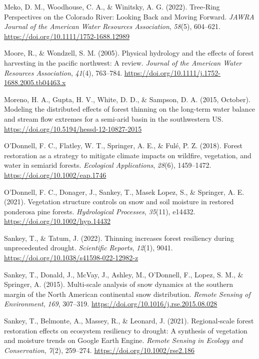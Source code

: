 \documentclass[
]{agujournal2019}
\newlength{\cslhangindent}
\newenvironment{CSLReferences}[2] %
 {\begin{list}{}{%
  \setlength{\itemindent}{0pt}
  \setlength{\leftmargin}{0pt}
  \setlength{\parsep}{0pt}
  \ifodd #1
   \setlength{\leftmargin}{\cslhangindent}
   \setlength{\itemindent}{-1\cslhangindent}
  \fi
  \setlength{\itemsep}{#2\baselineskip}}}
 {\end{list}}
\begin{document}
\begin{CSLReferences}{1}{0}
Meko, D. M., Woodhouse, C. A., \& Winitsky, A. G. (2022). Tree‐{Ring}
{Perspectives} on the {Colorado} {River}: {Looking} {Back} and {Moving}
{Forward}. \emph{JAWRA Journal of the American Water Resources
Association}, \emph{58}(5), 604--621.
\url{https://doi.org/10.1111/1752-1688.12989}

Moore, R., \& Wondzell, S. M. (2005). Physical hydrology and the effects
of forest harvesting in the pacific northwest: {A} review. \emph{Journal
of the American Water Resources Association}, \emph{41}(4), 763--784.
\url{https://doi.org/10.1111/j.1752-1688.2005.tb04463.x}

Moreno, H. A., Gupta, H. V., White, D. D., \& Sampson, D. A. (2015,
October). Modeling the distributed effects of forest thinning on the
long-term water balance and stream flow extremes for a semi-arid basin
in the southwestern {US}.
\url{https://doi.org/10.5194/hessd-12-10827-2015}

O'Donnell, F. C., Flatley, W. T., Springer, A. E., \& Fulé, P. Z.
(2018). Forest restoration as a strategy to mitigate climate impacts on
wildfire, vegetation, and water in semiarid forests. \emph{Ecological
Applications}, \emph{28}(6), 1459--1472.
\url{https://doi.org/10.1002/eap.1746}

O'Donnell, F. C., Donager, J., Sankey, T., Masek Lopez, S., \& Springer,
A. E. (2021). Vegetation structure controls on snow and soil moisture in
restored ponderosa pine forests. \emph{Hydrological Processes},
\emph{35}(11), e14432. \url{https://doi.org/10.1002/hyp.14432}

Sankey, T., \& Tatum, J. (2022). Thinning increases forest resiliency
during unprecedented drought. \emph{Scientific Reports}, \emph{12}(1),
9041. \url{https://doi.org/10.1038/s41598-022-12982-z}

Sankey, T., Donald, J., McVay, J., Ashley, M., O'Donnell, F., Lopez, S.
M., \& Springer, A. (2015). Multi-scale analysis of snow dynamics at the
southern margin of the {North} {American} continental snow distribution.
\emph{Remote Sensing of Environment}, \emph{169}, 307--319.
\url{https://doi.org/10.1016/j.rse.2015.08.028}

Sankey, T., Belmonte, A., Massey, R., \& Leonard, J. (2021).
Regional‐scale forest restoration effects on ecosystem resiliency to
drought: A synthesis of vegetation and moisture trends on {Google}
{Earth} {Engine}. \emph{Remote Sensing in Ecology and Conservation},
\emph{7}(2), 259--274. \url{https://doi.org/10.1002/rse2.186}


\end{CSLReferences}
\end{document}

